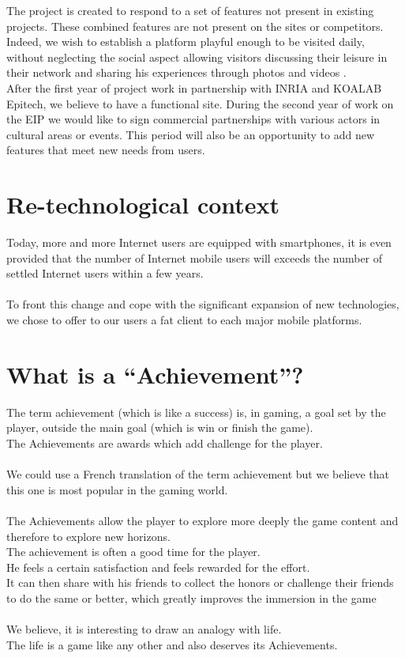 \documentclass {life-en}
\begin{document}
The project is created to respond to a set of features not present in existing projects. These combined features are not present on the sites or competitors. Indeed, we wish to establish a platform playful enough to be visited daily, without neglecting the social aspect allowing visitors discussing their leisure in their network and sharing his experiences through photos and videos .\\

After the first year of project work in partnership with INRIA and KOALAB Epitech, we believe to have a functional site. During the second year of work on the EIP we would like to sign commercial partnerships with various actors in cultural areas or events. This period will also be an opportunity to add new features that meet new needs from users.

\newpage

\section{Re-technological context}

Today, more and more Internet users are equipped with smartphones, it is even provided that the number of Internet mobile users will exceeds the number of settled Internet users within a few years.\\
\\
To front this change and cope with the significant expansion of new technologies, we chose to offer to our users a fat client to each major mobile platforms.

\section{What is a ``Achievement''?}
The term achievement (which is like a success) is, in gaming, a goal set by the player, outside the main goal (which is win or finish the game).\\
The Achievements are awards which add challenge for the player.\\
\\
We could use a French translation of the term achievement but we believe that this one is most popular in the gaming world.\\
\\
The Achievements allow the player to explore more deeply the game content and therefore to explore new horizons.\\
The achievement is often a good time for the player.\\
He feels a certain satisfaction and feels rewarded for the effort.\\
It can then share with his friends to collect the honors or challenge their friends to do the same or better, which greatly improves the immersion in the game \\
\\
We believe, it is interesting to draw an analogy with life.\\
The life is a game like any other and also deserves its Achievements.
\end{document}
